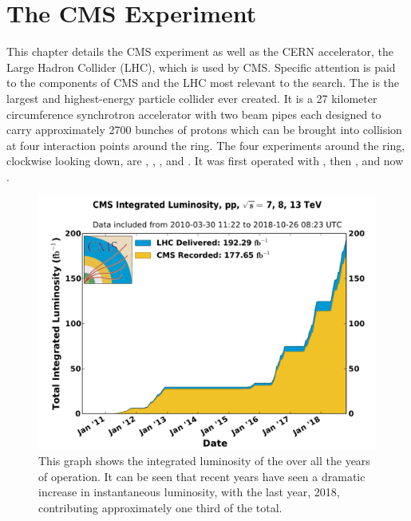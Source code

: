 \chapter{The CMS Experiment}
\label{experiment_chapter}
This chapter details the CMS experiment as well as the CERN accelerator, the Large Hadron Collider (LHC), which is used by CMS. Specific attention is paid to the components of CMS and the LHC most relevant to the \WR search.
The \LHC is the largest and highest-energy particle collider ever created.  It is a 27 kilometer circumference synchrotron accelerator with two beam pipes each designed to carry approximately 2700 bunches of protons which can be brought into collision at four interaction points around the ring. The four experiments around the ring, clockwise looking down, are \ALICE, \CMS, \LHCb, and \ATLAS.  It was first operated with \rootsseven, then \rootseight, and now \rootsthirteen.

\begin{figure}[!tp]
    \centering
    \includegraphics[width=\textwidth]{figures/int_lumi_allcumulative_pp.pdf}
    \caption[
        Multi-year delivered luminosity of the \LHC
    ]    
    {
        This graph shows the integrated luminosity of the \LHC over all the years of operation.  It can be seen that recent years have seen a dramatic increase in instantaneous luminosity, with the last year, 2018, contributing approximately one third of the total.
    }
    \label{fig:lhc_delv_lumi}

\end{figure}

